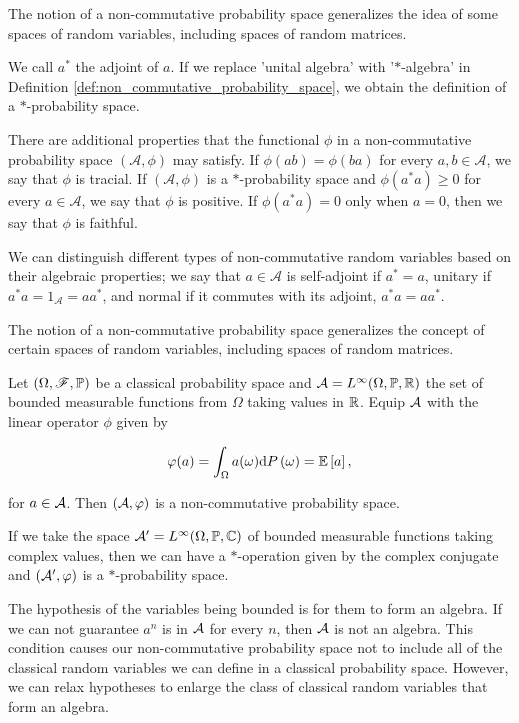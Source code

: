     The notion of a non-commutative probability space generalizes the idea of some spaces of random variables, including spaces of random matrices.

    We call \(a^*\) the adjoint of \(a\). If we replace 'unital algebra' with '\(*\)-algebra' in Definition \ref{def:non_commutative_probability_space}, we obtain the definition of a \(*\)-probability space.

    There are additional properties that the functional \(\phi\) in a non-commutative probability space \((\mathcal{A}, \phi)\) may satisfy. If \(\phi(ab) = \phi(ba)\) for every \(a, b \in \mathcal{A}\), we say that \(\phi\) is tracial. If \((\mathcal{A}, \phi)\) is a \(*\)-probability space and \(\phi(a^*a) \geq 0\) for every \(a \in \mathcal{A}\), we say that \(\phi\) is positive. If \(\phi(a^*a) = 0\) only when \(a = 0\), then we say that \(\phi\) is faithful.
    
    We can distinguish different types of non-commutative random variables based on their algebraic properties; we say that \(a \in \mathcal{A}\) is self-adjoint if \(a^* = a\), unitary if \(a^*a = 1_{\mathcal{A}} = aa^*\), and normal if it commutes with its adjoint, \(a^*a = aa^*\).
    
    The notion of a non-commutative probability space generalizes the concept of certain spaces of random variables, including spaces of random matrices.


    \begin{example}
        Let $(\Omega, \mathscr F, \mathbb P)$ be a classical probability space and $\mathcal A = L^\infty(\Omega, \mathbb P, \mathbb R)$ the set of bounded measurable functions from $\Omega$ taking values in $\mathbb R$. Equip $\mathcal A$ with the linear operator $\phi$ given by 

        \begin{equation*}
            \varphi(a) = \int_\Omega a(\omega) \mathrm d P\left( \omega \right) = \mathbb E \left[ a \right],
        \end{equation*}

        \noindent for $a \in \mathcal A$. Then $(\mathcal A,\varphi)$ is a non-commutative probability space. 

        If we take the space $\mathcal A' = L^\infty(\Omega, \mathbb P, \mathbb C)$ of bounded measurable functions taking complex values, then we can have a $*$-operation given by the complex conjugate and $(\mathcal A', \varphi)$ is a $*$-probability space.
    \end{example}

    The hypothesis of the variables being bounded is for them to form an algebra. If we can not guarantee $a^n$ is in $\mathcal A$ for every $n$, then $\mathcal A$ is not an algebra. This condition causes our non-commutative probability space not to include all of the classical random variables we can define in a classical probability space. However, we can relax hypotheses to enlarge the class of classical random variables that form an algebra.

